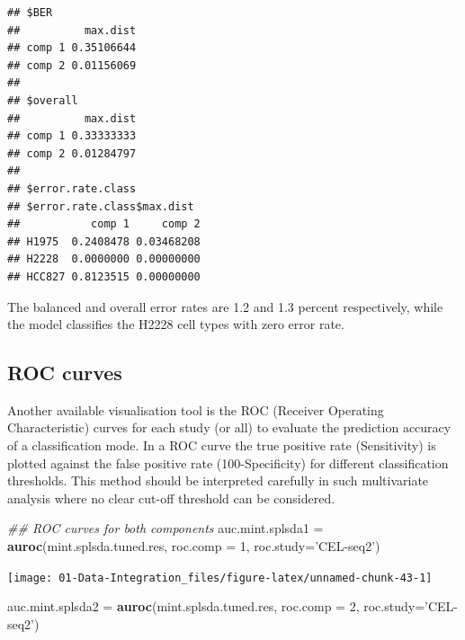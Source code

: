 \documentclass[]{book}
\newenvironment{Shaded}{\begin{snugshade}}{\end{snugshade}}
\newcommand{\CommentTok}[1]{\textcolor[rgb]{0.56,0.35,0.01}{\textit{#1}}}
\newcommand{\DataTypeTok}[1]{\textcolor[rgb]{0.13,0.29,0.53}{#1}}
\newcommand{\DecValTok}[1]{\textcolor[rgb]{0.00,0.00,0.81}{#1}}
\newcommand{\KeywordTok}[1]{\textcolor[rgb]{0.13,0.29,0.53}{\textbf{#1}}}
\newcommand{\NormalTok}[1]{#1}
\newcommand{\StringTok}[1]{\textcolor[rgb]{0.31,0.60,0.02}{#1}}
\theoremstyle{definition}
\theoremstyle{definition}
\theoremstyle{definition}
\theoremstyle{remark}
\begin{document}
\begin{verbatim}
## $BER
##          max.dist
## comp 1 0.35106644
## comp 2 0.01156069
## 
## $overall
##          max.dist
## comp 1 0.33333333
## comp 2 0.01284797
## 
## $error.rate.class
## $error.rate.class$max.dist
##           comp 1     comp 2
## H1975  0.2408478 0.03468208
## H2228  0.0000000 0.00000000
## HCC827 0.8123515 0.00000000
\end{verbatim}

The balanced and overall error rates are 1.2 and 1.3 percent
respectively, while the model classifies the H2228 cell types with zero
error rate.

\hypertarget{roc-curves}{%
\subsection{ROC curves}\label{roc-curves}}

Another available visualisation tool is the ROC (Receiver Operating
Characteristic) curves for each study (or all) to evaluate the
prediction accuracy of a classification mode. In a ROC curve the true
positive rate (Sensitivity) is plotted against the false positive rate
(100-Specificity) for different classification thresholds. This method
should be interpreted carefully in such multivariate analysis where no
clear cut-off threshold can be considered.

\begin{Shaded}
\begin{Highlighting}[]
\CommentTok{## ROC curves for both components}
\NormalTok{auc.mint.splsda1 =}\StringTok{ }\KeywordTok{auroc}\NormalTok{(mint.splsda.tuned.res, }\DataTypeTok{roc.comp =} \DecValTok{1}\NormalTok{, }\DataTypeTok{roc.study=}\StringTok{'CEL-seq2'}\NormalTok{)}
\end{Highlighting}
\end{Shaded}

\begin{center}\texttt{[image: 01-Data-Integration\_files/figure-latex/unnamed-chunk-43-1]} \end{center}

\begin{Shaded}
\begin{Highlighting}[]
\NormalTok{auc.mint.splsda2 =}\StringTok{ }\KeywordTok{auroc}\NormalTok{(mint.splsda.tuned.res, }\DataTypeTok{roc.comp =} \DecValTok{2}\NormalTok{, }\DataTypeTok{roc.study=}\StringTok{'CEL-seq2'}\NormalTok{)}
\end{Highlighting}
\end{Shaded}
\end{document}
